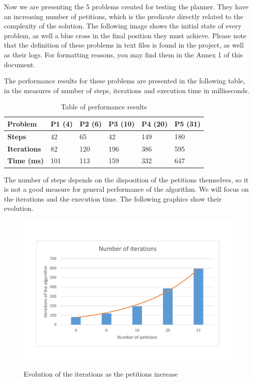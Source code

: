 \documentclass[12pt,a4paper,oneside]{article}
\numberwithin{equation}{section}
\numberwithin{equation}{section}
\theoremstyle{definition}
\begin{document}
Now we are presenting the 5 problems created for testing the planner. They have an increasing number of petitions, which is the predicate directly related to the complexity of the solution. The following image shows the initial state of every problem, as well a blue cross in the final position they must achieve. Please note that the definition of these problems in text files is found in the project, as well as their logs. For formatting reasons, you may find them in the Annex 1 of this document.

The performance results for these problems are presented in the following table, in the measures of number of steps, iterations and execution time in milliseconds.

\begin{table}[H]
	\centering
	\caption{Table of performance results}
	\label{results}
	\begin{tabular}{llllll}
		\hline
		Problem             & \textbf{P1 (4)} & \textbf{P2 (6)} & \textbf{P3 (10)} & \textbf{P4 (20)} & \textbf{P5 (31)} \\ \hline
		\textbf{Steps}      & 42          & 65          & 42          & 149         & 180         \\
		\textbf{Iterations} & 82          & 120         & 196         & 386         & 595         \\
		\textbf{Time (ms)}  & 101         & 113         & 159         & 332         & 647         \\ \hline
	\end{tabular}
\end{table}

The number of steps depends on the disposition of the petitions themselves, so it is not a good measure for general performance of the algorithm. We will focus on the iterations and the execution time. The following graphics show their evolution.

\begin{figure}[H]
	\centering
	\includegraphics[scale=0.4]{figures/iterations.pdf}
	\caption{Evolution of the iterations as the petitions increase}
	\label{iterations} 
\end{figure}
\end{document}
